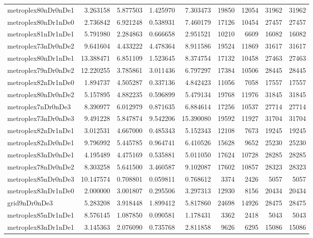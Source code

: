 \begin{longtable}{|l|r|r|r|r|r|r|r|r|}
metroplex80nDr0nDe1 & 3.263158 & 5.877503 & 1.425970 & 7.303473 & 19850 & 12054 & 31962 & 31962 \\
metroplex80nDr1nDe0 & 2.736842 & 6.921248 & 0.538931 & 7.460179 & 17126 & 10454 & 27457 & 27457 \\
metroplex81nDr1nDe1 & 5.791980 & 2.284863 & 0.666658 & 2.951521 & 10210 & 6609 & 16082 & 16082 \\
metroplex73nDr0nDe2 & 9.641604 & 4.433222 & 4.478364 & 8.911586 & 19524 & 11869 & 31617 & 31617 \\
metroplex80nDr1nDe1 & 13.388471 & 6.851109 & 1.523645 & 8.374754 & 17132 & 10458 & 27463 & 27463 \\
metroplex79nDr0nDe2 & 12.220255 & 3.785861 & 3.011436 & 6.797297 & 17384 & 10506 & 28445 & 28445 \\
metroplex82nDr1nDe0 & 1.894737 & 4.505287 & 0.337136 & 4.842423 & 11056 & 7058 & 17557 & 17557 \\
metroplex80nDr0nDe2 & 5.157895 & 4.882235 & 0.596899 & 5.479134 & 19768 & 11976 & 31845 & 31845 \\
metroplex7nDr0nDe3 & 8.390977 & 6.012979 & 0.871635 & 6.884614 & 17256 & 10537 & 27714 & 27714 \\
metroplex73nDr0nDe3 & 9.491228 & 5.847874 & 9.542206 & 15.390080 & 19592 & 11927 & 31704 & 31704 \\
metroplex82nDr1nDe1 & 3.012531 & 4.667000 & 0.485343 & 5.152343 & 12108 & 7673 & 19245 & 19245 \\
metroplex82nDr0nDe1 & 9.796992 & 5.445785 & 0.964741 & 6.410526 & 15628 & 9652 & 25230 & 25230 \\
metroplex83nDr0nDe1 & 4.195489 & 4.475169 & 0.535881 & 5.011050 & 17624 & 10728 & 28285 & 28285 \\
metroplex78nDr0nDe2 & 8.303258 & 5.641500 & 3.460587 & 9.102087 & 17602 & 10857 & 28323 & 28323 \\
metroplex85nDr0nDe3 & 10.147574 & 0.708801 & 0.059811 & 0.768612 & 3374 & 2426 & 5057 & 5057 \\
metroplex83nDr1nDe0 & 2.000000 & 3.001807 & 0.295506 & 3.297313 & 12930 & 8156 & 20434 & 20434 \\
grid9nDr0nDe3 & 5.283208 & 3.918448 & 1.899412 & 5.817860 & 24698 & 14926 & 28475 & 28475 \\
metroplex85nDr1nDe1 & 8.576145 & 1.087850 & 0.090581 & 1.178431 & 3362 & 2418 & 5043 & 5043 \\
metroplex83nDr1nDe1 & 3.145363 & 2.076090 & 0.735768 & 2.811858 & 9626 & 6295 & 15086 & 15086 \\

\end{longtable}
